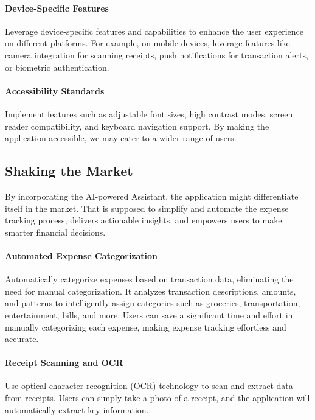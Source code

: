 \paragraph{Device-Specific Features}
Leverage device-specific features and capabilities to enhance the user experience on different platforms. For 
example, on mobile devices, leverage features like camera integration for scanning receipts, push notifications 
for transaction alerts, or biometric authentication.

\paragraph{Accessibility Standards}
Implement features such as adjustable font sizes, high contrast modes, screen reader compatibility, and keyboard 
navigation support. By making the application accessible, we may cater to a wider range of users.


\subsection{Shaking the Market}

By incorporating the AI-powered Assistant, the application might differentiate itself in the market. That is supposed 
to simplify and automate the expense tracking process, delivers actionable insights, and empowers users to make 
smarter financial decisions. 

\paragraph{Automated Expense Categorization}
Automatically categorize expenses based on transaction data, eliminating the need for manual categorization. 
It analyzes transaction descriptions, amounts, and patterns to intelligently assign categories such as groceries, 
transportation, entertainment, bills, and more. Users can save a significant time and effort in manually categorizing 
each expense, making expense tracking effortless and accurate.

\paragraph{Receipt Scanning and OCR}
Use optical character recognition (OCR) technology to scan and extract data from receipts. Users can simply take a photo 
of a receipt, and the application will automatically extract key information.

